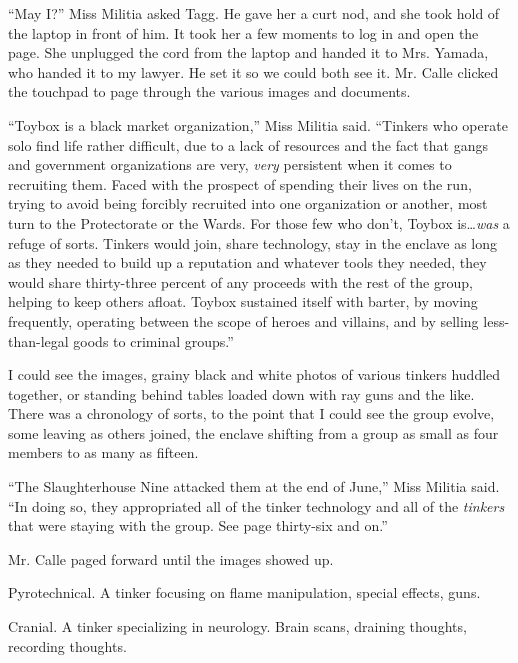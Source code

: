 ``May I?'' Miss Militia asked Tagg.  He gave her a curt nod, and she took hold of the laptop in front of him.  It took her a few moments to log in and open the page.  She unplugged the cord from the laptop and handed it to Mrs. Yamada, who handed it to my lawyer.  He set it so we could both see it.  Mr. Calle clicked the touchpad to page through the various images and documents.



``Toybox is a black market organization,'' Miss Militia said.  ``Tinkers who operate solo find life rather difficult, due to a lack of resources and the fact that gangs and government organizations are very, \emph{very} persistent when it comes to recruiting them.  Faced with the prospect of spending their lives on the run, trying to avoid being forcibly recruited into one organization or another, most turn to the Protectorate or the Wards.  For those few who don't, Toybox is\ldots \emph{was} a refuge of sorts.  Tinkers would join, share technology, stay in the enclave as long as they needed to build up a reputation and whatever tools they needed, they would share thirty-three percent of any proceeds with the rest of the group, helping to keep others afloat.  Toybox sustained itself with barter, by moving frequently, operating between the scope of heroes and villains, and by selling less-than-legal goods to criminal groups.''



I could see the images, grainy black and white photos of various tinkers huddled together, or standing behind tables loaded down with ray guns and the like.  There was a chronology of sorts, to the point that I could see the group evolve, some leaving as others joined, the enclave shifting from a group as small as four members to as many as fifteen.



``The Slaughterhouse Nine attacked them at the end of June,'' Miss Militia said.  ``In doing so, they appropriated all of the tinker technology and all of the \emph{tinkers} that were staying with the group.  See page thirty-six and on.''



Mr. Calle paged forward until the images showed up.



Pyrotechnical.  A tinker focusing on flame manipulation, special effects, guns.



Cranial.  A tinker specializing in neurology.  Brain scans, draining thoughts, recording thoughts.



